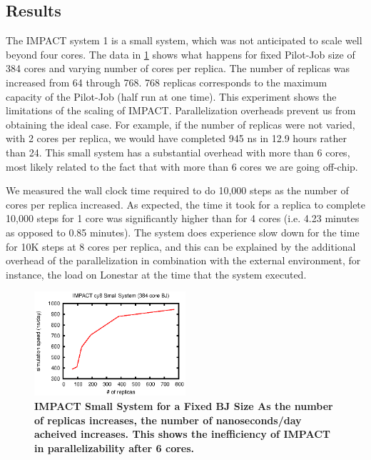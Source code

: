 \documentclass{sig-alternate}
\begin{document}

\subsection{Results}

The IMPACT system 1 is a small system, which was not anticipated to
scale well beyond four cores. The data in \ref{fig:impact_cy8} shows
what happens for fixed Pilot-Job size of 384 cores and varying number
of cores per replica. The number of replicas was increased from 64
through 768. 768 replicas corresponds to the maximum capacity of the
Pilot-Job (half run at one time). This experiment shows the
limitations of the scaling of IMPACT. Parallelization overheads
prevent us from obtaining the ideal case. For example, if the number
of replicas were not varied, with 2 cores per replica, we would have
completed 945 ns in 12.9 hours rather than 24. This small system has a
substantial overhead with more than 6 cores, most likely related to
the fact that with more than 6 cores we are going off-chip.

We measured the wall clock time required to do 10,000 steps as the number of cores per replica increased. As expected, the time it took for a replica to complete 10,000 steps for 1 core was significantly higher than for 4 cores (i.e. 4.23 minutes as opposed to 0.85 minutes). The system does experience slow down for the time for 10K steps at 8 cores per replica, and this can be explained by the additional overhead of the parallelization in combination with the external environment, for instance, the load on Lonestar at the time that the system executed.

\begin{figure}[t]
	\centering
		\includegraphics[width=0.5\textwidth]{impact_data/impact_cy8.eps}
	\caption{\textbf{IMPACT Small System for a Fixed BJ Size As the number of replicas  
                      increases, the number of nanoseconds/day acheived increases. This shows the inefficiency of IMPACT in parallelizability after 6 cores.}}
	\label{fig:impact_cy8}
\end{figure}
\end{document}
